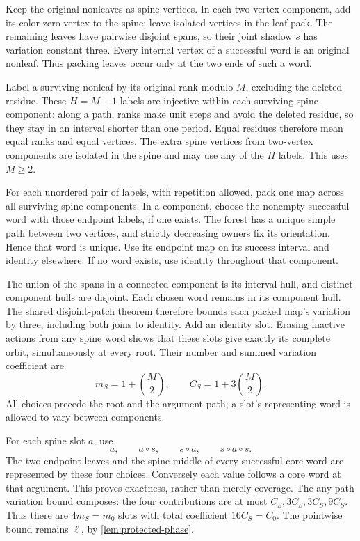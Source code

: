 \begin{outline}
Keep the original nonleaves as spine vertices. In each two-vertex
component, add its color-zero vertex to the spine; leave isolated vertices
in the leaf pack. The remaining leaves have pairwise disjoint spans,
so their joint shadow $s$ has variation constant three.
Every internal vertex of a successful word is an original nonleaf.
Thus packing leaves occur only at the two ends of such a word.

Label a surviving nonleaf by its original rank modulo $M$, excluding
the deleted residue. These $H=M-1$ labels are injective within each
surviving spine component: along a path, ranks make unit steps and avoid
the deleted residue, so they stay in an interval shorter than one period.
Equal residues therefore mean equal ranks and equal vertices. The extra
spine vertices from two-vertex components are isolated in the spine and
may use any of the $H$ labels. This uses $M\ge2$.

For each unordered pair of labels, with repetition allowed, pack one map
across all surviving spine components. In a component, choose the
nonempty successful word with those endpoint labels, if one exists.
The forest has a unique simple path between two vertices, and strictly
decreasing owners fix its orientation. Hence that word is unique.
Use its endpoint map on its success interval and identity elsewhere.
If no word exists, use identity throughout that component.

The union of the spans in a connected component is its interval hull,
and distinct component hulls are disjoint. Each chosen word remains in
its component hull. The shared disjoint-patch theorem therefore bounds
each packed map's variation by three, including both joins to identity.
Add an identity slot. Erasing inactive actions from any spine word shows
that these slots give exactly its complete orbit, simultaneously at every
root. Their number and summed variation coefficient are
\[
 m_S=1+\binom M2,
 \qquad C_S=1+3\binom M2.
\]
All choices precede the root and the argument path; a slot's representing
word is allowed to vary between components.

For each spine slot $a$, use
\[
 a,\qquad a\circ s,\qquad s\circ a,\qquad s\circ a\circ s.
\]
The two endpoint leaves and the spine middle of every successful core
word are represented by these four choices. Conversely each value follows
a core word at that argument. This proves exactness, rather than merely
coverage. The any-path variation bound composes: the four contributions
are at most $C_S,3C_S,3C_S,9C_S$. Thus there are $4m_S=m_0$
slots with total coefficient $16C_S=C_0$. The pointwise bound remains
$\ell$, by \cref{lem:protected-phase}.


\end{outline}
